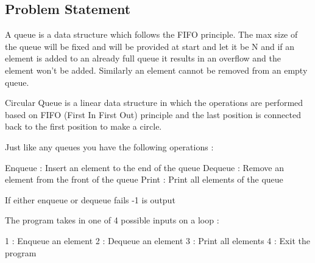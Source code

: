 \documentclass{article}
\begin{document}
\subsection{Problem Statement}
A queue is a data structure which follows the FIFO principle. The max size of the queue will be fixed and will be provided at start and let it be N and if an element is added to an already full queue it results in an overflow and the element won't be added. Similarly an element cannot be removed from an empty queue.

Circular Queue is a linear data structure in which the operations are performed based on FIFO (First In First Out) principle and the last position is connected back to the first position to make a circle.

Just like any queues you have the following operations :

    Enqueue : Insert an element to the end of the queue
    Dequeue : Remove an element from the front of the queue
    Print : Print all elements of the queue

If either enqueue or dequeue fails -1 is output

The program takes in one of 4 possible inputs on a loop :

    1 : Enqueue an element
    2 : Dequeue an element
    3 : Print all elements
    4 : Exit the program
    
\end{document}
